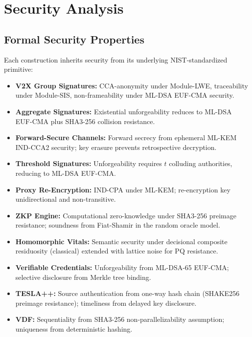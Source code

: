 \documentclass[conference,10pt]{IEEEtran}
\newcommand{\mlkem}{\textsf{ML-KEM}}
\newcommand{\mldsa}{\textsf{ML-DSA}}
\newcommand{\shake}{\textsf{SHAKE256}}
\newcommand{\shaiii}{\textsf{SHA3-256}}
\begin{document}
\section{Security Analysis}
\label{sec:security}

\subsection{Formal Security Properties}

Each construction inherits security from its underlying NIST-standardized primitive:

\begin{itemize}
    \item \textbf{V2X Group Signatures:} CCA-anonymity under Module-LWE, traceability under Module-SIS, non-frameability under \mldsa{} EUF-CMA security.
    \item \textbf{Aggregate Signatures:} Existential unforgeability reduces to \mldsa{} EUF-CMA plus \shaiii{} collision resistance.
    \item \textbf{Forward-Secure Channels:} Forward secrecy from ephemeral \mlkem{} IND-CCA2 security; key erasure prevents retrospective decryption.
    \item \textbf{Threshold Signatures:} Unforgeability requires $t$ colluding authorities, reducing to \mldsa{} EUF-CMA.
    \item \textbf{Proxy Re-Encryption:} IND-CPA under \mlkem{}; re-encryption key unidirectional and non-transitive.
    \item \textbf{ZKP Engine:} Computational zero-knowledge under \shaiii{} preimage resistance; soundness from Fiat-Shamir in the random oracle model.
    \item \textbf{Homomorphic Vitals:} Semantic security under decisional composite residuosity (classical) extended with lattice noise for PQ resistance.
    \item \textbf{Verifiable Credentials:} Unforgeability from \mldsa{}-65 EUF-CMA; selective disclosure from Merkle tree binding.
    \item \textbf{TESLA++:} Source authentication from one-way hash chain (\shake{} preimage resistance); timeliness from delayed key disclosure.
    \item \textbf{VDF:} Sequentiality from \shaiii{} non-parallelizability assumption; uniqueness from deterministic hashing.
\end{itemize}
\end{document}

